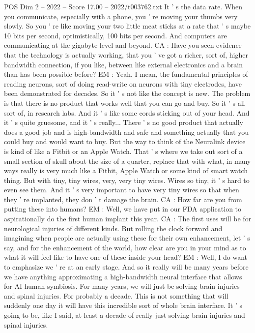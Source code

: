 \begin{textsample}{POS Dim 2 – 2022 – Score 17.00 – 2022/t003762.txt}
It ' s the data rate.
When you communicate, especially with a phone, you ' re moving your thumbs very slowly.
So you ' re like moving your two little meat sticks at a rate that ' s maybe 10 bits per second, optimistically, 100 bits per second.
And computers are communicating at the gigabyte level and beyond.
CA : Have you seen evidence that the technology is actually working, that you ' ve got a richer, sort of, higher bandwidth connection, if you like, between like external electronics and a brain than has been possible before?
EM : Yeah.
I mean, the fundamental principles of reading neurons, sort of doing read-write on neurons with tiny electrodes, have been demonstrated for decades.
So it ' s not like the concept is new.
The problem is that there is no product that works well that you can go and buy.
So it ' s all sort of, in research labs.
And it ' s like some cords sticking out of your head.
And it ' s quite gruesome, and it ' s really...
There ' s no good product that actually does a good job and is high-bandwidth and safe and something actually that you could buy and would want to buy.
But the way to think of the Neuralink device is kind of like a Fitbit or an Apple Watch.
That ' s where we take out sort of a small section of skull about the size of a quarter, replace that with what, in many ways really is very much like a Fitbit, Apple Watch or some kind of smart watch thing.
But with tiny, tiny wires, very, very tiny wires.
Wires so tiny, it ' s hard to even see them.
And it ' s very important to have very tiny wires so that when they ' re implanted, they don ' t damage the brain.
CA : How far are you from putting these into humans?
EM : Well, we have put in our FDA application to aspirationally do the first human implant this year.
CA : The first uses will be for neurological injuries of different kinds.
But rolling the clock forward and imagining when people are actually using these for their own enhancement, let ' s say, and for the enhancement of the world, how clear are you in your mind as to what it will feel like to have one of these inside your head?
EM : Well, I do want to emphasize we ' re at an early stage.
And so it really will be many years before we have anything approximating a high-bandwidth neural interface that allows for AI-human symbiosis.
For many years, we will just be solving brain injuries and spinal injuries.
For probably a decade.
This is not something that will suddenly one day it will have this incredible sort of whole brain interface.
It ' s going to be, like I said, at least a decade of really just solving brain injuries and spinal injuries.

\end{textsample}
